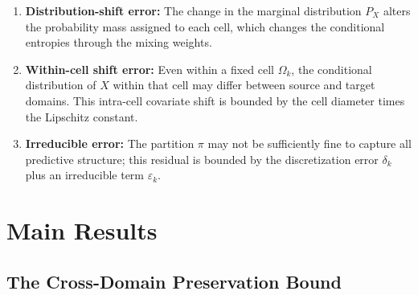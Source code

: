 \documentclass[12pt,a4paper]{article}
\begin{document}
\begin{enumerate}[label=(\roman*)]
    \item \textbf{Distribution-shift error:} The change in the marginal
          distribution $P_X$ alters the probability mass assigned to
          each cell, which changes the conditional entropies through the
          mixing weights.
    \item \textbf{Within-cell shift error:} Even within a fixed cell
          $\Omega_k$, the conditional distribution of $X$ within that
          cell may differ between source and target domains.  This
          intra-cell covariate shift is bounded by the cell diameter times
          the Lipschitz constant.
    \item \textbf{Irreducible error:} The partition $\pi$ may not be
          sufficiently fine to capture all predictive structure;
          this residual is bounded by the discretization error $\delta_k$
          plus an irreducible term $\varepsilon_k$.
\end{enumerate}

\section{Main Results}

\subsection{The Cross-Domain Preservation Bound}
\end{document}
